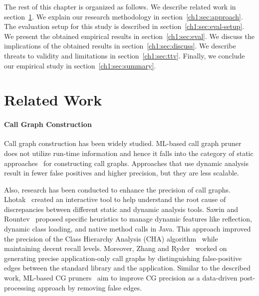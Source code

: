 The rest of this chapter is organized as follows. We describe related work in section~\ref{ch1:sec:related-work}. We explain our research methodology in section~\ref{ch1:sec:approach}. The evaluation setup for this study is described in section~\ref{ch1:sec:eval-setup}. We present the obtained empirical results in section~\ref{ch1:sec:eval}. We discuss the implications of the obtained results in section~\ref{ch1:sec:discuss}. We describe threats to validity and limitations in section~\ref{ch1:sec:ttv}. Finally, we conclude our empirical study in section~\ref{ch1:sec:summary}.

\newpage

\section{Related Work}\label{ch1:sec:related-work}
\paragraph{Call Graph Construction}
Call graph construction has been widely studied. ML-based call graph pruner
does not utilize run-time information and hence it falls into the category of
static approaches~\cite{murphy1998empirical, reif2019judge, sui2020recall} for constructing call graphs. Approaches that use dynamic analysis~\cite{xie2002empirical, hejderup2018software} result in fewer false positives and higher precision, but they are less scalable.

Also, research has been conducted to enhance the precision of call graphs. Lhotak~\cite{lhotak2007comparing} created an interactive tool to help understand the root cause of discrepancies between different static and dynamic analysis tools. Sawin and Rountev~\cite{sawin2011assumption} proposed specific heuristics to manage dynamic features like reflection, dynamic class loading, and native method calls in Java. This approach improved the precision of the Class Hierarchy Analysis (CHA) algorithm~\cite{dean1995optimization} while maintaining decent recall levels. Moreover, Zhang and Ryder~\cite{zhang2007automatic} worked on generating precise application-only call graphs by distinguishing false-positive edges between the standard library and the application. 
%
Similar to the described work, ML-based CG pruners~\cite{utture2022striking, le2022autopruner} aim to improve CG precision as a data-driven post-processing approach by removing false edges.


